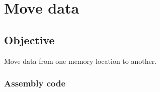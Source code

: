 \section{Move data}

\subsection{Objective}

Move data from one memory location to another.

\subsubsection{Assembly code}

